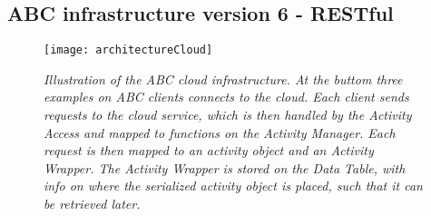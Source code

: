 \subsection{ABC infrastructure version 6 - RESTful}

\par\vspace{\baselineskip}

\begin{figure}[!htbp]
  \centering
    \texttt{[image: architectureCloud]}
  \caption{\emph{Illustration of the ABC cloud infrastructure. At the buttom three examples on ABC clients connects to the cloud. Each client sends requests to the cloud service, which is then handled by the Activity Access and mapped to functions on the Activity Manager. Each request is then mapped to an activity object and an Activity Wrapper. The Activity Wrapper is stored on the Data Table, with info on where the serialized activity object is placed, such that it can be retrieved later.}}
  \label{fig:infrastructure}
\end{figure}

\par\vspace{\baselineskip}

